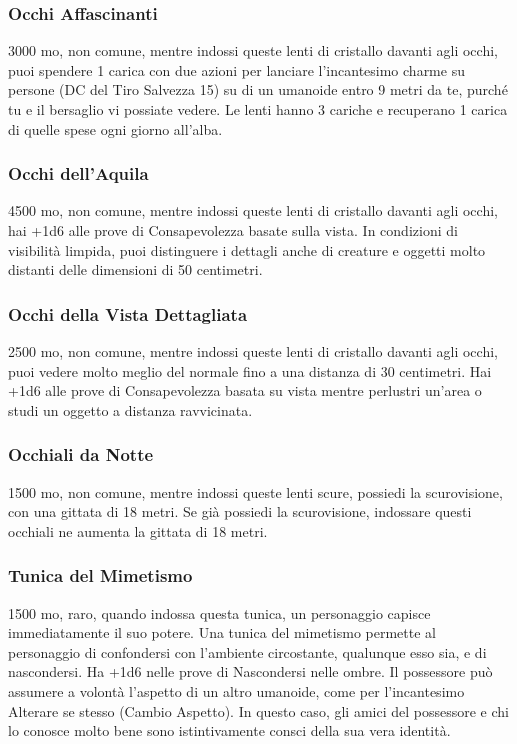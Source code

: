 \begin{multicols}{2}
	\subsubsection*{Occhi Affascinanti}
	3000 mo, non comune, mentre indossi queste lenti di cristallo davanti agli occhi, puoi spendere 1 carica con due azioni per lanciare l'incantesimo charme su persone (DC del Tiro Salvezza 15) su di un umanoide entro 9 metri da te, purché tu e il bersaglio vi possiate vedere. Le lenti hanno 3 cariche e recuperano 1 carica di quelle spese ogni giorno all'alba.

	\subsubsection*{Occhi dell'Aquila}
	4500 mo, non comune, mentre indossi queste lenti di cristallo davanti agli occhi, hai +1d6 alle prove di Consapevolezza basate sulla vista. In condizioni di visibilità limpida, puoi distinguere i dettagli anche di creature e oggetti molto distanti delle dimensioni di 50 centimetri.

	\subsubsection*{Occhi della Vista Dettagliata}
	2500 mo, non comune, mentre indossi queste lenti di cristallo davanti agli occhi, puoi vedere molto meglio del normale fino a una distanza di 30 centimetri. Hai +1d6 alle prove di Consapevolezza basata su vista mentre perlustri un'area o studi un oggetto a distanza ravvicinata.

	\subsubsection*{Occhiali da Notte}
	1500 mo, non comune, mentre indossi queste lenti scure, possiedi la scurovisione, con una gittata di 18 metri. Se già possiedi la scurovisione, indossare questi occhiali ne aumenta la gittata di 18 metri.

	\subsubsection*{Tunica del Mimetismo}
	1500 mo, raro, quando indossa questa tunica, un personaggio capisce immediatamente il suo potere. Una tunica del mimetismo permette al personaggio di confondersi con l’ambiente circostante, qualunque esso sia, e di nascondersi. Ha +1d6 nelle prove di Nascondersi nelle ombre. Il possessore può assumere a volontà l'aspetto di un altro umanoide, come per l'incantesimo Alterare se stesso (Cambio Aspetto). In questo caso, gli amici del possessore e chi lo conosce molto bene sono istintivamente consci della sua vera identità.


\end{multicols}
